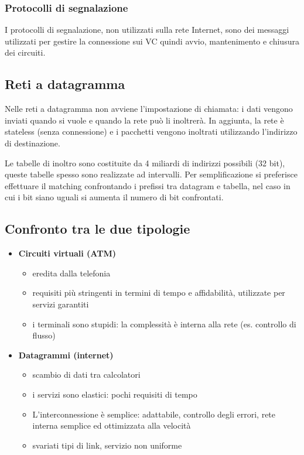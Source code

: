 \documentclass{report}
\begin{document}
\hypertarget{header-n21}{%
\subsubsection{Protocolli di segnalazione}\label{header-n21}}

I protocolli di segnalazione, non utilizzati sulla rete Internet, sono
dei messaggi utilizzati per gestire la connessione sui VC quindi avvio,
mantenimento e chiusura dei circuiti.

\hypertarget{header-n23}{%
\subsection{Reti a datagramma}\label{header-n23}}

Nelle reti a datagramma non avviene l'impostazione di chiamata: i dati
vengono inviati quando si vuole e quando la rete può li inoltrerà. In
aggiunta, la rete è stateless (senza connessione) e i pacchetti vengono
inoltrati utilizzando l'indirizzo di destinazione.

Le tabelle di inoltro sono costituite da 4 miliardi di indirizzi
possibili (32 bit), queste tabelle spesso sono realizzate ad intervalli.
Per semplificazione si preferisce effettuare il matching confrontando i
prefissi tra datagram e tabella, nel caso in cui i bit siano uguali si
aumenta il numero di bit confrontati.

\hypertarget{header-n26}{%
\subsection{Confronto tra le due tipologie}\label{header-n26}}

\begin{itemize}
\item
  \textbf{Circuiti virtuali (ATM)}

  \begin{itemize}
  \item
    eredita dalla telefonia
  \item
    requisiti più stringenti in termini di tempo e affidabilità,
    utilizzate per servizi garantiti
  \item
    i terminali sono stupidi: la complessità è interna alla rete (es.
    controllo di flusso)
  \end{itemize}
\item
  \textbf{Datagrammi (internet)}

  \begin{itemize}
  \item
    scambio di dati tra calcolatori
  \item
    i servizi sono elastici: pochi requisiti di tempo
  \item
    L'interconnessione è semplice: adattabile, controllo degli errori,
    rete interna semplice ed ottimizzata alla velocità
  \item
    svariati tipi di link, servizio non uniforme
  \end{itemize}
\end{itemize}
\end{document}
